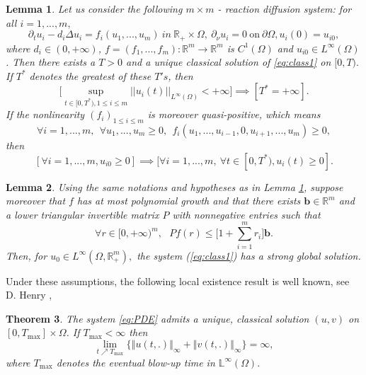 \documentclass[10pt]{amsart}
\newtheorem{theorem}{Theorem}[section]
\newtheorem{lemma}[theorem]{Lemma}
\theoremstyle{definition}
\begin{document}
\begin{lemma}\label{lem:class1}
Let us consider the following $m\times m$ - reaction diffusion system: for all $i=1,...,m,$ 
\begin{equation}
\label{eq:class1}
\partial_t u_i-d_i\Delta u_i=f_i(u_1,...,u_m)~in~ \mathbb{R}_+\times \Omega,~ \partial_\nu u_i=0~ \text{on}~ \partial \Omega, u_i(0)=u_{i0},
\end{equation}
where $d_i \in(0,+\infty)$, $f=(f_1,...,f_m):\mathbb{R}^m \rightarrow \mathbb{R}^m$ is $C^1(\Omega)$ and $u_{i0}\in L^{\infty}(\Omega)$. Then there exists a $T>0$ and a unique classical solution of \ref{eq:class1} on $[0,T).$ If $T^*$ denotes the greatest of these $T's$, then 
\begin{equation*}
\Bigg[\sup_{t \in [0,T^*),1\leq i\leq m} ||u_i(t)||_{L^{\infty}(\Omega)} < +\infty \Bigg] \implies [T^*=+\infty].
\end{equation*}
If the nonlinearity $(f_i)_{1\leq i\leq m}$ is moreover quasi-positive, which means 
$$\forall i=1,..., m,~~\forall u_1,..., u_m \geq 0,~~f_i(u_1,...,u_{i-1}, 0, u_{i+1}, ..., u_m)\geq 0,$$
then $$[\forall i=1,..., m, u_{i0}\geq 0]\implies [\forall i=1,...,m,~ \forall t\in [0,T^*), u_i(t)\geq 0].$$
\end{lemma}

\begin{lemma}\label{lem:class2}
Using the same notations and hypotheses as in Lemma \ref{lem:class1}, suppose moreover that $f$ has at most polynomial growth and that there exists $\mathbf{b}\in \mathbb{R}^m$ and a lower triangular invertible matrix $P$ with nonnegative entries such that  $$\forall r \in [0,+\infty)^m,~~~Pf(r)\leq \Bigg[1+ \sum_{i=1}^{m} r_i \Bigg]\mathbf{b}.$$
Then, for $u_0 \in L^{\infty}(\Omega, \mathbb{R}_+^m),$ the system (\ref{eq:class1}) has a strong global solution.
\end{lemma}

Under these assumptions, the following local existence result is well known, see D. Henry \cite{henry}, 

\begin{theorem}
\label{thm:class3}
The system \eqref{eq:PDE} admits a unique, classical solution $(u,v)$ on $%
[0,T_{\max }]\times \Omega $. If $T_{\max }<\infty $ then 
\begin{equation}
\underset{t\nearrow T_{\max }}{\lim }\Big\{ \left\Vert u(t,.)\right\Vert
_{\infty }+\left\Vert v(t,.)\right\Vert _{\infty } \Big\} =\infty ,  
\end{equation}%
where $T_{\max }$ denotes the eventual blow-up time in $\mathbb{L}^{\infty }(\Omega ).$
\end{theorem}
\end{document}
